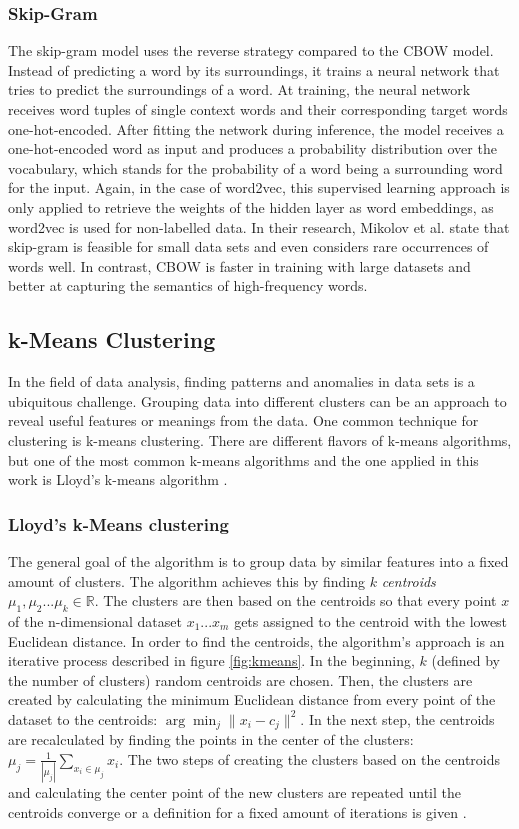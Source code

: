 \documentclass[
    fontsize=12pt,
    headings=small,
    parskip=half,           %
    bibliography=totoc,
    numbers=noenddot,       %
    open=any,               %
    ]{scrreprt}
\begin{document}
\subsubsection{Skip-Gram}
The skip-gram model uses the reverse strategy compared to the CBOW model. Instead of predicting a word by its surroundings, it trains a neural network that tries to predict the surroundings of a word. At training, the neural network receives word tuples of single context words and their corresponding target words one-hot-encoded. After fitting the network during inference, the model receives a one-hot-encoded word as input and produces a probability distribution over the vocabulary, which stands for the probability of a word being a surrounding word for the input. Again, in the case of word2vec, this supervised learning approach is only applied to retrieve the weights of the hidden layer as word embeddings, as word2vec is used for non-labelled data. In their research, Mikolov et al. state that skip-gram is feasible for small data sets and even considers rare occurrences of words well. In contrast, CBOW is faster in training with large datasets and better at capturing the semantics of high-frequency words. 

\subsection{k-Means Clustering}
In the field of data analysis, finding patterns and anomalies in data sets is a ubiquitous challenge. Grouping data into different clusters can be an approach to reveal useful features or meanings from the data. One common technique for clustering is k-means clustering. There are different flavors of k-means algorithms, but one of the most common k-means algorithms and the one applied in this work is Lloyd's k-means algorithm \cite{wilkin2007kmeans}. 
\subsubsection{Lloyd's k-Means clustering}
The general goal of the algorithm is to group data by similar features into a fixed amount of clusters. The algorithm achieves this by finding $k$ \emph{centroids} $\mu_1, \mu_2 ... \mu_k \in \mathbb{R}$. The clusters are then based on the centroids so that every point $x$ of the n-dimensional dataset ${x_1 ... x_m}$ gets assigned to the centroid with the lowest Euclidean distance. In order to find the centroids, the algorithm's approach is an iterative process described in figure \ref{fig:kmeans}. In the beginning, $k$ (defined by the number of clusters) random centroids are chosen. Then, the clusters are created by calculating the minimum Euclidean distance from every point of the dataset to the centroids: $\arg\min_j \|x_i - c_j\|^2$. In the next step, the centroids are recalculated by finding the points in the center of the clusters: $\mu_j = \frac{1}{|\mu_j|} \sum_{x_i \in \mu_j} x_i$. The two steps of creating the clusters based on the centroids and calculating the center point of the new clusters are repeated until the centroids converge or a definition for a fixed amount of iterations is given \cite{piech2013kmeans} \cite{lloyd1982kmeans}.
\end{document}
